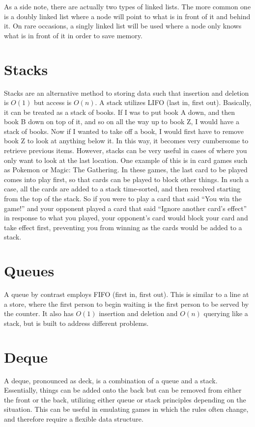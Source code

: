 As a side note, there are actually two types of linked lists. The more common one is a doubly linked list where a node will point to what is in front of it and behind it. On rare occasions, a singly linked list will be used where a node only knows what is in front of it in order to save memory.

\section{Stacks}

Stacks are an alternative method to storing data such that insertion and deletion is $O(1)$ but access is $O(n)$. A stack utilizes LIFO (last in, first out). Basically, it can be treated as a stack of books. If I was to put book A down, and then book B down on top of it, and so on all the way up to book Z, I would have a stack of books. Now if I wanted to take off a book, I would first have to remove book Z to look at anything below it. In this way, it becomes very cumbersome to retrieve previous items. However, stacks can be very useful in cases of where you only want to look at the last location. One example of this is in card games such as Pokemon or Magic: The Gathering. In these games, the last card to be played comes into play first, so that cards can be played to block other things. In such a case, all the cards are added to a stack time-sorted, and then resolved starting from the top of the stack. So if you were to play a card that said “You win the game!” and your opponent played a card that said “Ignore another card’s effect” in response to what you played, your opponent’s card would block your card and take effect first, preventing you from winning as the cards would be added to a stack.

\section{Queues}

A queue by contrast employs FIFO (first in, first out). This is similar to a line at a store, where the first person to begin waiting is the first person to be served by the counter. It also has $O(1)$ insertion and deletion and $O(n)$ querying like a stack, but is built to address different problems.

\section{Deque}

A deque, pronounced as deck, is a combination of a queue and a stack. Essentially, things can be added onto the back but can be removed from either the front or the back, utilizing either queue or stack principles depending on the situation. This can be useful in emulating games in which the rules often change, and therefore require a flexible data structure.

